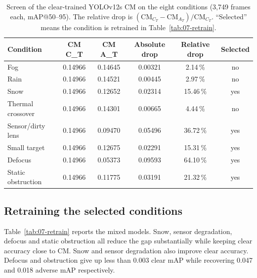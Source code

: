 \documentclass[11pt,a4paper]{article}
\begin{document}
\begin{table}[H]
\centering
\footnotesize
\setlength{\tabcolsep}{5pt}
\caption{Screen of the clear-trained YOLOv12s CM on the eight conditions
(3,749 frames each, mAP@50--95). The relative drop is
$(\mathrm{CM}_{C_T} - \mathrm{CM}_{A_T}) / \mathrm{CM}_{C_T}$. ``Selected''
means the condition is retrained in Table~\ref{tab:07-retrain}.}
\label{tab:07-screen}
\begin{tabular}{@{}lccccc@{}}
\toprule
Condition & CM C\_T & CM A\_T & Absolute drop & Relative drop & Selected \\
\midrule
Fog               & 0.14966 & 0.14645 & 0.00321 & 2.14\,\%  & no \\
Rain              & 0.14966 & 0.14521 & 0.00445 & 2.97\,\%  & no \\
Snow              & 0.14966 & 0.12652 & 0.02314 & 15.46\,\% & yes \\
Thermal crossover & 0.14966 & 0.14301 & 0.00665 & 4.44\,\%  & no \\
Sensor/dirty lens & 0.14966 & 0.09470 & 0.05496 & 36.72\,\% & yes \\
Small target      & 0.14966 & 0.12675 & 0.02291 & 15.31\,\% & yes \\
Defocus           & 0.14966 & 0.05373 & 0.09593 & 64.10\,\% & yes \\
Static obstruction& 0.14966 & 0.11775 & 0.03191 & 21.32\,\% & yes \\
\bottomrule
\end{tabular}
\end{table}

\subsection{Retraining the selected conditions}
Table~\ref{tab:07-retrain} reports the mixed models. Snow, sensor degradation,
defocus and static obstruction all reduce the gap substantially while keeping
clear accuracy close to CM. Snow and sensor degradation also improve clear
accuracy. Defocus and obstruction give up less than 0.003 clear mAP while
recovering 0.047 and 0.018 adverse mAP respectively.
\end{document}

